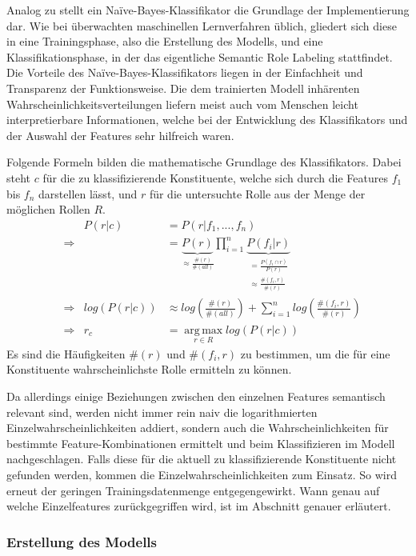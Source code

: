 \documentclass[12pt]{article}
\begin{document}
Analog zu \cite{gildea} stellt ein Naïve-Bayes-Klassifikator die Grundlage der Implementierung dar. Wie bei überwachten maschinellen Lernverfahren üblich, gliedert sich diese in eine Trainingsphase, also die Erstellung des Modells, und eine Klassifikationsphase, in der das eigentliche Semantic Role Labeling stattfindet. Die Vorteile des Naïve-Bayes-Klassifikators liegen in der Einfachheit und Transparenz der Funktionsweise. Die dem trainierten Modell inhärenten Wahrscheinlichkeitsverteilungen liefern meist auch vom Menschen leicht interpretierbare Informationen, welche bei der Entwicklung des Klassifikators und der Auswahl der Features sehr hilfreich waren. 


Folgende Formeln bilden die mathematische Grundlage des Klassifikators. Dabei steht $c$ für die zu klassifizierende Konstituente, welche sich durch die Features $f_1$ bis $f_n$ darstellen lässt, und $r$ für die untersuchte Rolle aus der Menge der möglichen Rollen $R$.
\begin{align}
& & P(r|c)&=P(r|f_1,...,f_n)\\
&\Rightarrow & &=\underbrace{P(r)}_{\approx \frac{\#(r)}{\#(all)}}\prod_{i=1}^n \underbrace{P(f_i|r)}_{\substack{=\frac{P(f_i\cap r)}{P(r)}\\\approx\frac{\#(f_i, r)}{\#(r)}}}\\
&\Rightarrow & log(P(r|c))&\approx log\left(\frac{\#(r)}{\#(all)}\right) + \sum_{i=1}^n log\left(\frac{\#(f_i, r)}{\#(r)}\right)\label{mat:norm}\\
&\Rightarrow & r_c &= \operatorname*{arg\,max}_{r \in R} log(P(r|c))
\end{align}
Es sind die Häufigkeiten $\#(r)$ und $\#(f_i, r)$ zu bestimmen, um die für eine Konstituente wahrscheinlichste Rolle ermitteln zu können.

Da allerdings einige Beziehungen zwischen den einzelnen Features semantisch relevant sind, werden nicht immer rein naiv die logarithmierten Einzelwahrscheinlichkeiten addiert, sondern auch die Wahrscheinlichkeiten für bestimmte Feature-Kombinationen ermittelt und beim Klassifizieren im Modell nachgeschlagen. Falls diese für die aktuell zu klassifizierende Konstituente nicht gefunden werden, kommen die Einzelwahrscheinlichkeiten zum Einsatz. So wird erneut der geringen Trainingsdatenmenge entgegengewirkt. Wann genau auf welche Einzelfeatures zurückgegriffen wird, ist im Abschnitt  genauer erläutert.

\subsubsection*{Erstellung des Modells}
\end{document}
